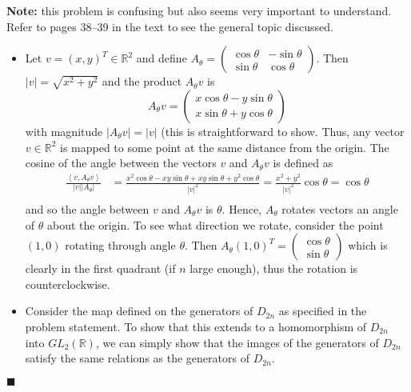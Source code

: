 \documentclass[12pt]{article}
\renewcommand{\qed}{\hfill$\blacksquare$}
\renewenvironment{proof}{\begin{addmargin}[1em]{0em}\begin{newproof}}{\end{newproof}\end{addmargin}\qed}
\begin{document}
\begin{proof}
\textbf{Note:} this problem is confusing but also seems very important to understand. Refer to pages 38--39 in the text to see the general topic discussed.
\begin{itemize}
    \item Let $v = \left(x,y\right)^T \in \mathbb{R}^2$ and define $A_{\theta} = \left(\begin{array}{cc}\cos\theta & -\sin \theta \\ \sin \theta & \cos \theta \end{array}\right)$. Then $\left|v\right| = \sqrt{x^2+y^2}$ and the product $A_{\theta}v$ is
    $$ A_{\theta}v = \left( \begin{array}{c} x\cos \theta - y\sin \theta \\ x\sin \theta + y\cos \theta \end{array}\right) $$ with magnitude $\left|A_{\theta}v\right| = \left|v\right|$ (this is straightforward to show. Thus, any vector $v\in \mathbb{R}^2$ is mapped to some point at the same distance from the origin. The cosine of the angle between the vectors $v$ and $A_{\theta}v$ is defined as
    \begin{equation*}
        \begin{split}
            \frac{\left\langle v,A_{\theta}v\right\rangle}{\left|v\right|\left|A_{\theta}\right|} & = \frac{x^2\cos \theta - xy\sin \theta + xy\sin \theta + y^2\cos \theta }{\left|v\right|^2} = \frac{x^2+y^2}{\left|v\right|^2} \cos \theta = \cos \theta \\
        \end{split}
    \end{equation*}
    and so the angle between $v$ and $A_{\theta}v$ is $\theta$. Hence, $A_{\theta}$ rotates vectors an angle of $\theta$ about the origin. To see what direction we rotate, consider the point $\left(1,0\right)$ rotating through angle $\theta$. Then $A_{\theta}\left(1,0\right)^T = \left(\begin{array}{c} \cos \theta \\ \sin \theta \end{array}\right) $ which is clearly in the first quadrant (if $n$ large enough), thus the rotation is counterclockwise.

    \item Consider the map defined on the generators of $D_{2n}$ as specified in the problem statement. To show that this extends to a homomorphism of $D_{2n}$ into $GL_2\left(\mathbb{R}\right)$, we can simply show that the images of the generators of $D_{2n}$ satisfy the same relations as the generators of $D_{2n}$.


\end{itemize}
\end{proof}
\end{document}
